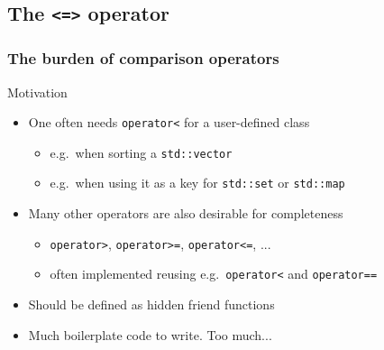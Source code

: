 \subsection[spaceship]{The \texttt{<=>} operator}

\begin{frame}[fragile]
  \frametitle{The burden of comparison operators}
  \begin{block}{Motivation}
    \begin{itemize}
    \item One often needs \texttt{operator<} for a user-defined class
      \begin{itemize}
      \item e.g.\ when sorting a \texttt{std::vector}
      \item e.g.\ when using it as a key for \texttt{std::set} or \texttt{std::map}
      \end{itemize}
    \item Many other operators are also desirable for completeness
      \begin{itemize}
      \item \texttt{operator>}, \texttt{operator>=}, \texttt{operator<=}, ...
      \item often implemented reusing e.g.\ \texttt{operator<} and \texttt{operator==}
      \end{itemize}
    \item Should be defined as hidden friend functions
    \item Much boilerplate code to write. Too much...
    \end{itemize}
  \end{block}
\end{frame}

